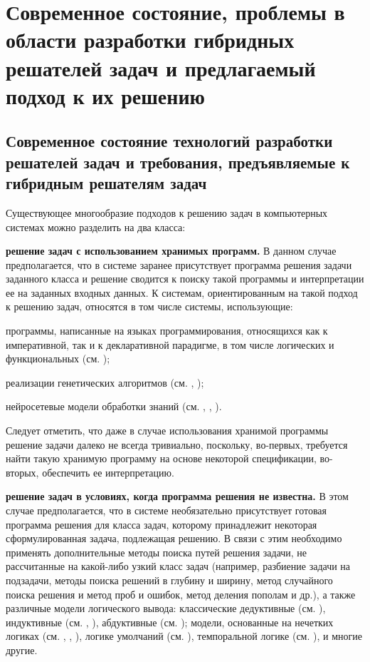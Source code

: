 \section{Современное состояние, проблемы в области разработки гибридных решателей задач и предлагаемый подход к их решению}
\label{sec_ps_problems}

\subsection{Современное состояние технологий разработки решателей задач и требования, предъявляемые к гибридным решателям задач}

Существующее многообразие подходов к решению задач в компьютерных системах можно разделить на два класса:
\begin{textitemize}
	\item \textbf{решение задач с использованием хранимых программ.} В данном случае предполагается, что в системе заранее присутствует программа решения задачи заданного класса и решение сводится к поиску такой программы и интерпретации ее на заданных входных данных. К системам, ориентированным на такой подход к решению задач, относятся в том числе системы, использующие:
	\begin{textitemize}
		\item программы, написанные на языках программирования, относящихся как к императивной, так и к декларативной парадигме, в том числе логических и функциональных (см. );
		\item реализации генетических алгоритмов (см. , );
		\item нейросетевые модели обработки знаний (см. ,  , ).
	\end{textitemize}	
	
	Следует отметить, что даже в случае использования хранимой программы решение задачи далеко не всегда тривиально, поскольку, во-первых, требуется найти такую хранимую программу на основе некоторой спецификации, во-вторых, обеспечить ее интерпретацию.
	
	\item \textbf{решение задач в условиях, когда программа решения не известна.} В этом случае предполагается, что в системе необязательно присутствует готовая программа решения для класса задач, которому принадлежит некоторая сформулированная задача, подлежащая решению. В связи с этим необходимо применять дополнительные методы поиска путей решения задачи, не рассчитанные на какой-либо узкий класс задач (например, разбиение задачи на подзадачи, методы поиска решений в глубину и ширину, метод случайного поиска решения и метод проб и ошибок, метод деления пополам и др.), а также различные модели логического вывода: классические дедуктивные (см. ), индуктивные (см. , ), абдуктивные (см. ); модели, основанные на нечетких логиках (см. , , ), логике умолчаний (см. ), темпоральной логике (см. ), и многие другие.
\end{textitemize}

